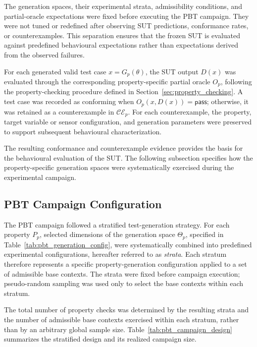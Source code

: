 \documentclass[preprint,12pt]{elsarticle}
\begin{document}
The generation spaces, their experimental strata, admissibility conditions,
and partial-oracle expectations were fixed before executing the PBT campaign.
They were not tuned or redefined after observing SUT predictions, conformance
rates, or counterexamples. This separation ensures that the frozen SUT is
evaluated against predefined behavioural expectations rather than expectations
derived from the observed failures.

For each generated valid test case \(x=G_p(\theta)\), the SUT output \(D(x)\)
was evaluated through the corresponding property-specific partial oracle
\(O_p\), following the property-checking procedure defined in
Section~\ref{sec:property_checking}. A test case was recorded as conforming
when \(O_p(x,D(x))=\mathsf{pass}\); otherwise, it was retained as a
counterexample in \(\mathcal{CE}_p\). For each counterexample, the property,
target variable or sensor configuration, and generation parameters were
preserved to support subsequent behavioural characterization.

The resulting conformance and counterexample evidence provides the basis for
the behavioural evaluation of the SUT. The following subsection specifies how
the property-specific generation spaces were systematically exercised during
the experimental campaign.

\subsection{PBT Campaign Configuration}
\label{sec:pbt_campaign}

The PBT campaign followed a stratified test-generation strategy. For each
property \(P_p\), selected dimensions of the generation space \(\Theta_p\),
specified in Table~\ref{tab:pbt_generation_config}, were systematically
combined into predefined experimental configurations, hereafter referred to
as \emph{strata}. Each stratum therefore represents a specific
property-generation configuration applied to a set of admissible base
contexts. The strata were fixed before campaign execution; pseudo-random
sampling was used only to select the base contexts within each stratum.

The total number of property checks was determined by the resulting strata
and the number of admissible base contexts exercised within each stratum,
rather than by an arbitrary global sample size.
Table~\ref{tab:pbt_campaign_design} summarizes the stratified design and its
realized campaign size.
\end{document}
